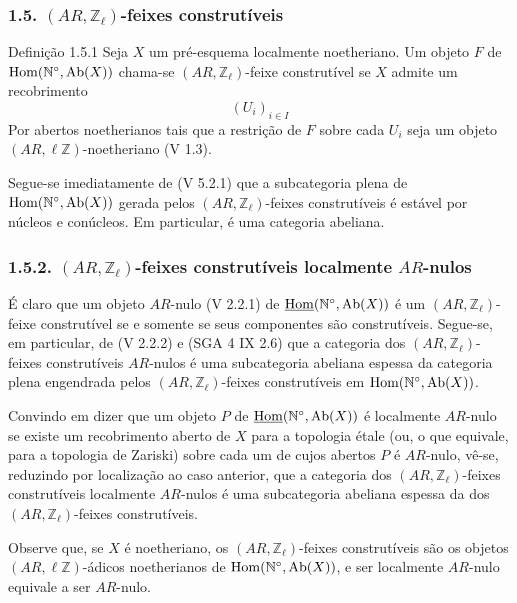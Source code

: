 \subsubsection*{1.5. \((AR,\mathbb Z_\ell)\)-feixes construtíveis}

\begin{statement}{Definição 1.5.1}
Seja \(X\) um pré-esquema localmente noetheriano. Um objeto \(F\) de \(\operatorname{Hom}(\mathbb N^\circ,\operatorname{Ab}(X))\) chama-se \((AR,\mathbb Z_\ell)\)-feixe construtível se \(X\) admite um recobrimento
\[
(U_i)_{i\in I}
\]
Por abertos noetherianos tais que a restrição de \(F\) sobre cada \(U_i\) seja um objeto \((AR,\ell\mathbb Z)\)-noetheriano (V 1.3).
\end{statement}

Segue-se imediatamente de (V 5.2.1) que a subcategoria plena de \(\operatorname{Hom}(\mathbb N^\circ,\operatorname{Ab}(X))\) gerada pelos \((AR,\mathbb Z_\ell)\)-feixes construtíveis é estável por núcleos e conúcleos. Em particular, é uma categoria abeliana.

\subsubsection*{1.5.2. \((AR,\mathbb Z_\ell)\)-feixes construtíveis localmente \(AR\)-nulos}

É claro que um objeto \(AR\)-nulo (V 2.2.1) de \(\underline{\operatorname{Hom}}(\mathbb N^\circ,\operatorname{Ab}(X))\) é um \((AR,\mathbb Z_\ell)\)-feixe construtível se e somente se seus componentes são construtíveis. Segue-se, em particular, de (V 2.2.2) e (SGA 4 IX 2.6) que a categoria dos \((AR,\mathbb Z_\ell)\)-feixes construtíveis \(AR\)-nulos é uma subcategoria abeliana espessa da categoria plena engendrada pelos \((AR,\mathbb Z_\ell)\)-feixes construtíveis em \(\operatorname{Hom}(\mathbb N^\circ,\operatorname{Ab}(X))\).

Convindo em dizer que um objeto \(P\) de \(\underline{\operatorname{Hom}}(\mathbb N^\circ,\operatorname{Ab}(X))\) é localmente \(AR\)-nulo se existe um recobrimento aberto de \(X\) para a topologia étale (ou, o que equivale, para a topologia de Zariski) sobre cada um de cujos abertos \(P\) é \(AR\)-nulo, vê-se, reduzindo por localização ao caso anterior, que a categoria dos \((AR,\mathbb Z_\ell)\)-feixes construtíveis localmente \(AR\)-nulos é uma subcategoria abeliana espessa da dos \((AR,\mathbb Z_\ell)\)-feixes construtíveis.

Observe que, se \(X\) é noetheriano, os \((AR,\mathbb Z_\ell)\)-feixes construtíveis são os objetos \((AR,\ell\mathbb Z)\)-ádicos noetherianos de \(\operatorname{Hom}(\mathbb N^\circ,\operatorname{Ab}(X))\), e ser localmente \(AR\)-nulo equivale a ser \(AR\)-nulo.

